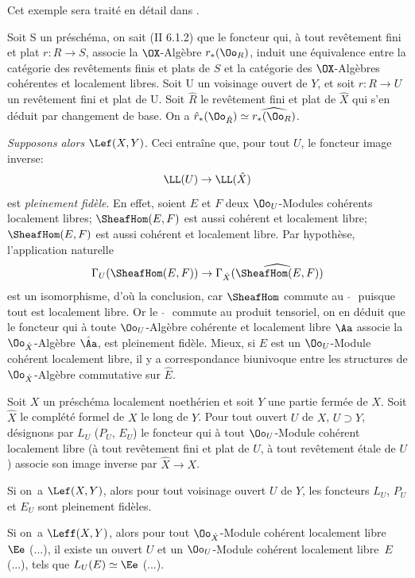 Cet exemple sera trait\'e en d\'etail dans \Exp {}.

Soit S un pr\'esch\'ema, on sait (\EGA II 6.1.2) que le foncteur qui, \`a tout rev\^etement fini et plat $r\colon R\to S$, associe la $\OX$-Alg\`ebre $r_\ast(\Oo_R)$, induit une \'equivalence entre la cat\'egorie des rev\^etements finis et plats de $S$ et la cat\'egorie des $\OX$-Alg\`ebres coh\'erentes et localement libres. Soit U un voisinage ouvert de $Y$, et soit $r\colon R\to U$ un rev\^etement fini et plat de U. Soit $\hat{R}$ le rev\^etement fini et plat de $\hat{X}$ qui s'en d\'eduit par changement de base. On a $\hat{r}_\ast(\Oo_{\hat{R}})\simeq\widehat{r_\ast(\Oo_R)}$.

\emph{Supposons alors} $\Lef(X, Y)$. Ceci entra\^ine que, pour tout $U$, le foncteur image inverse:
\[
\LL(U) \to \LL(\hat{X})
\]
est \emph{pleinement fid\`ele}. En effet, soient $E$ et $F$ deux $\Oo_U$-Modules coh\'erents localement libres; $\SheafHom(E, F)$ est aussi coh\'erent et localement libre; $\SheafHom(E, F)$ est aussi coh\'erent et localement libre. Par hypoth\`ese, l'application naturelle
\[
\Gamma_U (\SheafHom(E, F)) \to \Gamma_{\hat{X}}(\widehat{\SheafHom(E, F)})
\]
est un isomorphisme, d'o\`u la conclusion, car $\SheafHom$ commute au $\, \, \hat{}\, \, $ puisque tout est localement libre. Or le $\, \, \hat{}\, \, $ commute au produit tensoriel, on en d\'eduit que le foncteur qui \`a toute $\Oo_U$-Alg\`ebre coh\'erente et localement libre $\Aa$ associe la $\Oo_{\hat{X}}$-Alg\`ebre $\hat{\Aa}$, est pleinement fid\`ele. Mieux, si $E$ est un $\Oo_U$-Module coh\'erent localement libre\pageoriginale, il y a correspondance biunivoque entre les structures de $\Oo_{\hat{X}}$-Alg\`ebre commutative sur $\hat{E}$.

\begin{proposition} \label{X.2.3}
Soit $X$ un pr\'esch\'ema localement noeth\'erien et soit $Y$ une partie ferm\'ee de $X$. Soit $\hat{X}$ le compl\'et\'e formel de $X$ le long de $Y$. Pour tout ouvert $U$ de $X$, $U\supset Y$, d\'esignons par $L_U$ (\resp $P_U$, \resp $E_U$) le foncteur qui \`a tout $\Oo_U$-Module coh\'erent localement libre (\resp \`a tout rev\^etement fini et plat de $U$, \resp \`a tout rev\^etement \'etale de $U$) associe son image inverse par $\hat{X} \to X$.
\begin{enumeratei}
\item
Si on~a $\Lef(X, Y)$, alors pour tout voisinage ouvert $U$ de $Y$, les foncteurs $L_U$, $P_U$ et $E_U$ sont pleinement fid\`eles.

\item
Si on~a $\Leff(X, Y)$, alors pour tout $\Oo_{\hat{X}}$-Module coh\'erent localement libre~$\Ee$ (\resp ...), il existe un ouvert $U$ et un $\Oo_U$-Module coh\'erent localement libre~$E$ (\resp ...), tels que $L_U(E) \simeq \Ee$ (\resp ...).
\end{enumeratei}
\end{proposition}

